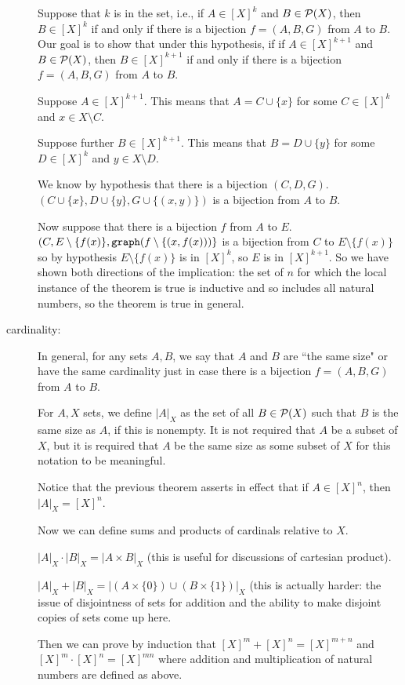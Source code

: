 \documentclass[12pt]{article}
\begin{document}
\begin{description}
Suppose that $k$ is in the set, i.e.,  if $A \in [X]^k$ and $B \in {\cal P}(X)$, then $B \in [X]^k$ if and only if there is a bijection $f=(A,B,G)$ from $A$ to $B$.  Our goal is to show that under this hypothesis, if  if $A \in [X]^{k+1}$ and $B \in {\cal P}(X)$, then $B \in [X]^{k+1}$ if and only if there is a bijection $f=(A,B,G)$ from $A$ to $B$.

Suppose $A \in [X]^{k+1}$.  This means that $A = C \cup \{x\}$ for some $C \in [X]^k$ and $x \in X\setminus C$.

Suppose further $B \in [X]^{k+1}$.  This means that $B = D \cup \{y\}$ for some $D \in [X]^k$ and $y \in X\setminus D$.

We know by hypothesis that there is a bijection $(C,D,G)$.  $(C \cup \{x\},D\cup \{y\},G \cup \{(x,y)\})$ is a bijection from $A$ to $B$.

Now suppose that there is a bijection $f$ from $A$ to $E$.  $(C,E\setminus \{f(x)\},{\tt graph}(f \setminus \{(x,f(x)))\}$  is a bijection from $C$ to $E\setminus \{f(x)\}$ so by hypothesis $E\setminus \{f(x)\}$ is in $[X]^k$, so $E$ is in 
$[X]^{k+1}$.  So we have shown both directions of the implication: the set of $n$ for which the local instance of the theorem is true is inductive and so includes all natural numbers, so the theorem is true in general.

\item[cardinality:]  In general, for any sets $A,B$, we say that $A$ and $B$ are ``the same size" or have the same cardinality just in case there is a bijection $f=(A,B,G)$ from $A$ to $B$.

For $A, X$ sets, we define $|A|_X$ as the set of all $B \in {\cal P}(X)$ such that $B$ is the same size as $A$, if this is nonempty.  It is not required that $A$ be a subset of $X$, but it is required that $A$ be the same size as some subset of $X$ for this notation to be meaningful.

Notice that the previous theorem asserts in effect that if $A \in [X]^n$, then $|A|_X = [X]^n$.

Now we can define sums and products of cardinals relative to $X$.

$|A|_X \cdot |B|_X = |A \times B|_X$ (this is useful for discussions of cartesian product).

$|A|_X + |B|_X = |(A \times \{0\}) \cup (B \times \{1\})|_X$ (this is actually harder:  the issue of disjointness
of sets for addition and the ability to make disjoint copies of sets come up here.

Then we can prove by induction that $[X]^m + [X]^n = [X]^{m+n}$ and $[X]^m \cdot [X]^n = [X]^{mn}$ where addition and multiplication of natural numbers are defined as above.


\end{description}
\end{document}
